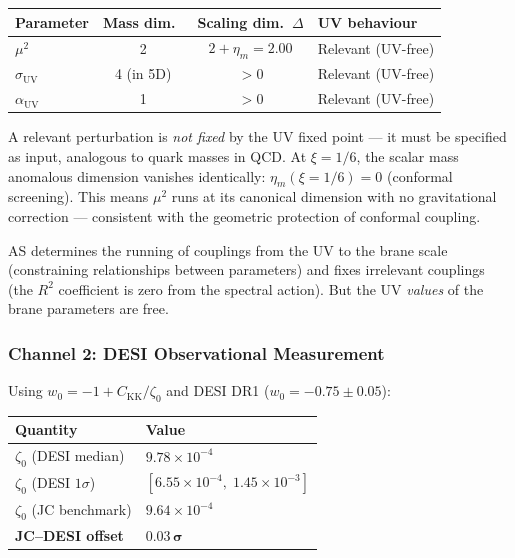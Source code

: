 \begin{center}
\small
\begin{tabular}{l c c l}
\hline
Parameter & Mass dim.\ & Scaling dim.\ $\Delta$ & UV behaviour \\
\hline
$\mu^2$              & 2 & $2 + \eta_m = 2.00$ & Relevant (UV-free) \\
$\sigma_{\mathrm{UV}}$ & 4 (in 5D) & $> 0$ & Relevant (UV-free) \\
$\alpha_{\mathrm{UV}}$ & 1 & $> 0$ & Relevant (UV-free) \\
\hline
\end{tabular}
\end{center}

\noindent
A relevant perturbation is \emph{not fixed} by the UV fixed point --- it must be specified as input, analogous to quark masses in QCD. At $\xi = 1/6$, the scalar mass anomalous dimension vanishes identically: $\eta_m(\xi{=}1/6) = 0$ (conformal screening). This means $\mu^2$ runs at its canonical dimension with no gravitational correction --- consistent with the geometric protection of conformal coupling.

AS determines the running of couplings from the UV to the brane scale (constraining relationships between parameters) and fixes irrelevant couplings (the $R^2$ coefficient is zero from the spectral action). But the UV \emph{values} of the brane parameters are free.

\subsubsection{Channel 2: DESI Observational Measurement}

Using $w_0 = -1 + C_\mathrm{KK}/\zeta_0$ and DESI DR1 ($w_0 = -0.75 \pm 0.05$):

\begin{center}
\begin{tabular}{l l}
\hline
Quantity & Value \\
\hline
$\zeta_0$ (DESI median)      & $9.78 \times 10^{-4}$ \\
$\zeta_0$ (DESI $1\sigma$)   & $[6.55 \times 10^{-4},\; 1.45 \times 10^{-3}]$ \\
$\zeta_0$ (JC benchmark)     & $9.64 \times 10^{-4}$ \\
\textbf{JC--DESI offset}     & $\mathbf{0.03\,\sigma}$ \\
\hline
\end{tabular}
\end{center}

